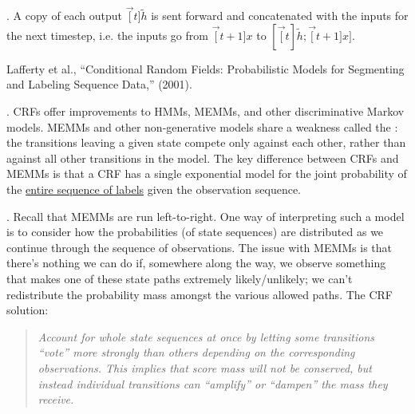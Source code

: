 \documentclass[11pt]{article}
\begin{document}
\myspace
\p {}. A copy of each output $\vec[t]{\tilde h}$ is sent forward and concatenated with the inputs for the next timestep, i.e. the inputs go from $\vec[t+1]{x}$ to $[\vec[t]{\tilde h}; \vec[t+1]{x}]$. 








\label{Conditional Random Fields}


\vspace{-1em}
{\footnotesize Lafferty et al., ``Conditional Random Fields: Probabilistic Models for Segmenting and Labeling Sequence Data,'' (2001).}

\p {}. CRFs offer improvements to HMMs, MEMMs, and other discriminative Markov models. MEMMs and other non-generative models share a weakness called the : the transitions leaving a given
state compete only against each other, rather than against all other transitions in the model. The key difference between CRFs and MEMMs is that a CRF has a single exponential model for the joint probability of the \underline{entire sequence of labels} given the observation sequence.

\myspace
\p {}. Recall that MEMMs are run left-to-right. One way of interpreting such a model is to consider how the probabilities (of state sequences) are distributed as we continue through the sequence of observations. The issue with MEMMs is that there's nothing we can do if, somewhere along the way, we observe something that makes one of these state paths extremely likely/unlikely; we can't redistribute the probability mass amongst the various allowed paths. The CRF solution:
\vspace{-1em}
\begin{quote}
	{\small \textit{Account for whole state sequences at once by letting some transitions ``vote''
			more strongly than others depending on the corresponding observations. This implies that score mass will not be conserved, but instead individual transitions can ``amplify'' or
			``dampen'' the mass they receive.}}
\end{quote}
\end{document}

